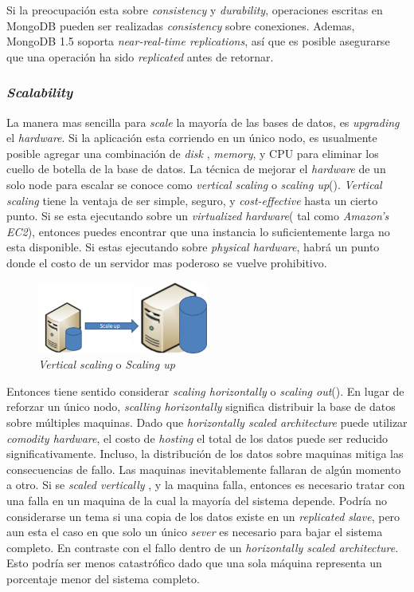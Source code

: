 Si la preocupación esta sobre \textit{consistency} y \textit{durability}, operaciones escritas en MongoDB pueden ser realizadas \textit{consistency} sobre conexiones. Ademas, MongoDB 1.5 soporta \textit{near-real-time replications}, así que es posible asegurarse que una operación ha sido \textit{replicated} antes de retornar.

\subsubsection{\textit{Scalability}}
La manera mas sencilla para \textit{scale} la mayoría de las bases de datos, es \textit{upgrading} el \textit{hardware}. Si la aplicación esta corriendo en un único nodo, es usualmente posible agregar una combinación de \textit{disk} , \textit{memory}, y CPU para eliminar los cuello de botella de la base de datos. La técnica de mejorar el \textit{hardware} de un solo node para escalar se conoce como \textit{vertical scaling} o \textit{scaling up}(). \textit{Vertical scaling} tiene la ventaja de ser simple, seguro, y \textit{cost-effective} hasta un cierto punto. Si se esta ejecutando sobre un \textit{virtualized hardware}( tal como \textit{Amazon's EC2}), entonces puedes encontrar que una instancia lo suficientemente larga no esta disponible. Si estas ejecutando sobre \textit{physical hardware}, habrá un punto donde el costo de un servidor mas poderoso se vuelve prohibitivo.

\begin{figure}[h!]
	\centering
	\includegraphics[width=0.5\textwidth]{figuras/cap2/scale_up.png}
	\caption{\textit{Vertical scaling} o \textit{Scaling up} }
	\label{figure:figure_scale_up}
\end{figure}

Entonces tiene sentido  considerar \textit{scaling horizontally} o \textit{scaling out}(). En lugar de reforzar un único nodo, \textit{scalling horizontally} significa distribuir la base de datos sobre múltiples maquinas. Dado que \textit{horizontally scaled architecture} puede utilizar \textit{comodity hardware}, el costo de \textit{hosting} el total de los datos puede ser reducido significativamente. Incluso, la distribución  de los datos sobre maquinas mitiga las consecuencias de fallo. Las maquinas inevitablemente fallaran de algún momento a otro. Si se \textit{scaled vertically} , y la maquina falla, entonces es necesario tratar con una falla en un maquina de la cual la mayoría del sistema depende. Podría no considerarse un tema si una copia de los datos existe en un \textit{replicated slave}, pero aun esta el caso en que solo un único \textit{sever} es necesario para bajar el sistema completo. En contraste con el fallo dentro de un \textit{horizontally scaled architecture}. Esto podría ser menos catastrófico dado que una sola máquina representa un porcentaje menor del sistema completo.

